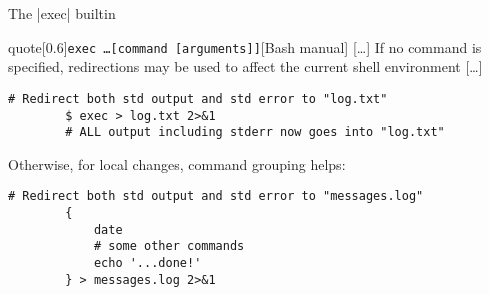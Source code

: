 \begin{frame}[fragile]{The \bash|exec| builtin}
    \vspace{-2mm}
    \begin{varblock}{quote}[0.6\textwidth]{\texttt{exec \ldots [command [arguments]]}}[Bash manual]
        [\ldots] If no command is specified, redirections may be used to affect the current shell environment [\ldots]\smallskip
    \end{varblock}
    \begin{lstlisting}[style=MyBash, aboveskip=2mm, belowskip=-4mm, numbers=none]
        # Redirect both std output and std error to "log.txt"
        $ exec > log.txt 2>&1
        # ALL output including stderr now goes into "log.txt"
    \end{lstlisting}
    Otherwise, for local changes, command grouping helps:
    \begin{lstlisting}[style=MyBash, numbers=none, aboveskip=2mm]
        # Redirect both std output and std error to "messages.log"
        {
            date
            # some other commands
            echo '...done!'
        } > messages.log 2>&1
    \end{lstlisting}
\end{frame}
